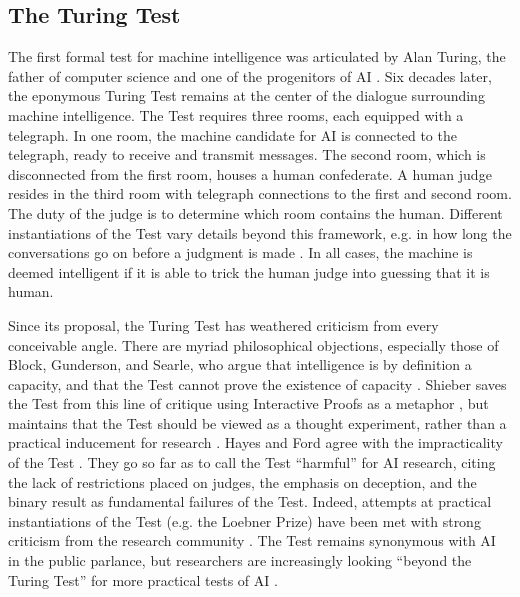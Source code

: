 \subsection{The Turing Test}

The first formal test for machine intelligence was articulated by Alan Turing, the father of computer science and one of the progenitors of AI  \citep{turing1950computing}. Six decades later, the eponymous Turing Test remains at the center of the dialogue surrounding machine intelligence. The Test requires three rooms, each equipped with a telegraph. In one room, the machine candidate for AI is connected to the telegraph, ready to receive and transmit messages. The second room, which is disconnected from the first room, houses a human confederate. A human judge resides in the third room with telegraph connections to the first and second room. The duty of the judge is to determine which room contains the human. Different instantiations of the Test vary details beyond this framework, e.g. in how long the conversations go on before a judgment is made  \citep{loebner2003home, bishop2010testing}. In all cases, the machine is deemed intelligent if it is able to trick the human judge into guessing that it is human.

Since its proposal, the Turing Test has weathered criticism from every conceivable angle. There are myriad philosophical objections, especially those of Block, Gunderson, and Searle, who argue that intelligence is by definition a capacity, and that the Test cannot prove the existence of capacity   \citep{block1980intuitions, gunderson1964vii, searle1980minds}. Shieber saves the Test from this line of critique using Interactive Proofs as a metaphor  \citep{shieber2007turing}, but maintains that the Test should be viewed as a thought experiment, rather than a practical inducement for research  \citep{shieber2015}. Hayes and Ford agree with the impracticality of the Test  \citep{hayes1995turing}. They go so far as to call the Test ``harmful'' for AI research, citing the lack of restrictions placed on judges, the emphasis on deception, and the binary result as fundamental failures of the Test. Indeed, attempts at practical instantiations of the Test (e.g. the Loebner Prize) have been met with strong criticism from the research community  \citep{shieber1994lessons, occasional_pamphlet_2014}. The Test remains synonymous with AI in the public parlance, but researchers are increasingly looking ``beyond the Turing Test'' for more practical tests of AI  \citep{1_the_newyorker_2015, you2015beyond}.

